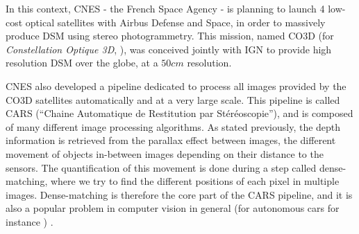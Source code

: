 In this context, CNES - the French Space Agency - is planning to launch 4 low-cost optical satellites with Airbus Defense and Space, in order to massively produce DSM using stereo photogrammetry. This mission, named CO3D (for \textit{Constellation Optique 3D}, \cite{melet_co3d_2020}), was conceived jointly with IGN to provide high resolution DSM over the globe, at a $50cm$ resolution.

CNES also developed a pipeline dedicated to process all images provided by the CO3D satellites automatically and at a very large scale. This pipeline is called CARS (``Chaine Automatique de Restitution par Stéréoscopie''), and is composed of many different image processing algorithms. As stated previously, the depth information is retrieved from the parallax effect between images, \ie the different movement of objects in-between images depending on their distance to the sensors. The quantification of this movement is done during a step called dense-matching, where we try to find the different positions of each pixel in multiple images. Dense-matching is therefore the core part of the CARS pipeline, and it is also a popular problem in computer vision in general (for autonomous cars for instance \cite{geiger_are_2012}) .

